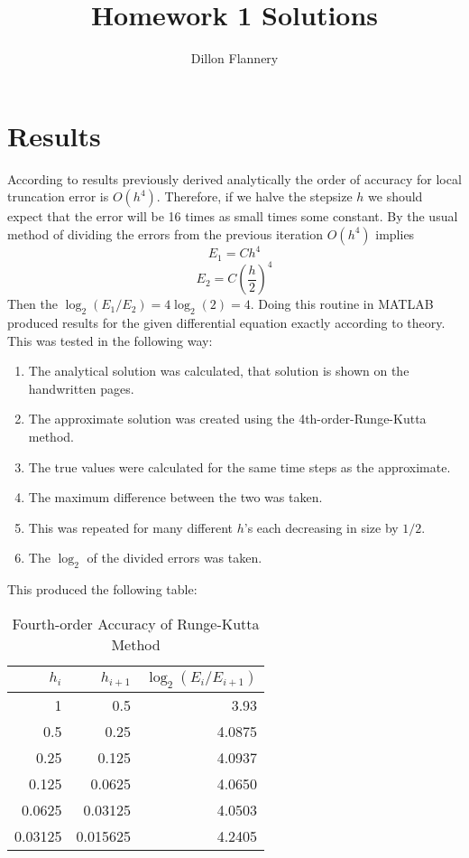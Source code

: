 \documentclass[]{article}
\title{Homework 1 Solutions}
\author{Dillon Flannery}
\begin{document}
\maketitle

\section{Results} According to results previously derived analytically the order of accuracy for local truncation error is $ O(h^4) $. Therefore, if we halve the stepsize $ h $ we should expect that the error will be 16 times as small times some constant. By the usual method of dividing the errors from the previous iteration $ O(h^4) $ implies
\[
E_1 = Ch^4
\]
\[
E_2 = C(\frac{h}{2})^4
\]
Then the $ \log_2(E_1/E_2) = 4 \log_2(2) = 4$. Doing this routine in MATLAB produced results for the given differential equation exactly according to theory. This was tested in the following way:
\begin{enumerate}
	\item The analytical solution was calculated, that solution is shown on the handwritten pages.
	\item The approximate solution was created using the 4th-order-Runge-Kutta method.
	\item The true values were calculated for the same time steps as the approximate.
	\item The maximum difference between the two was taken.
	\item This was repeated for many different $ h $'s each decreasing in size by $ 1/2 $.
	\item The $ \log_2  $ of the divided errors was taken.
\end{enumerate}
This produced the following table:
\begin{table}[H]
	\centering
	\caption{Fourth-order Accuracy of Runge-Kutta Method}
	\begin{tabular}{rrr}
		$ h_i $ & $ h_{i+1} $ & $ \log_2(E_i/E_{i+1}) $\\
		\hline 
		\hline 
		1 & 0.5 & 3.93\\
		0.5 & 0.25 & 4.0875\\
		0.25 & 0.125 & 4.0937\\
		0.125 & 0.0625 & 4.0650\\ 
		0.0625 &  0.03125 & 4.0503 \\
		0.03125 & 0.015625 &  4.2405\\
		\hline
	\end{tabular}
\end{table}
	
\end{document}
